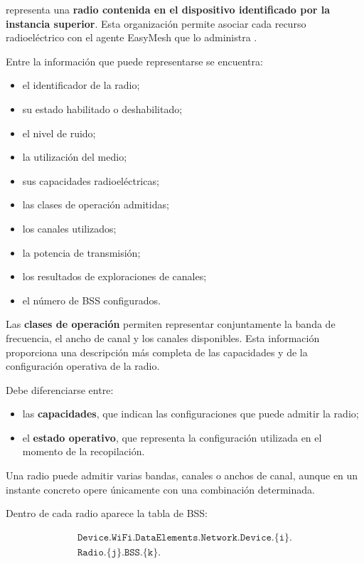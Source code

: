 representa una \textbf{radio contenida en el dispositivo identificado por
la instancia superior}. Esta organización permite asociar cada recurso
radioeléctrico con el agente EasyMesh que lo administra
\cite{bbf_tr181}.

Entre la información que puede representarse se encuentra:

\begin{itemize}
    \item el identificador de la radio;
    \item su estado habilitado o deshabilitado;
    \item el nivel de ruido;
    \item la utilización del medio;
    \item sus capacidades radioeléctricas;
    \item las clases de operación admitidas;
    \item los canales utilizados;
    \item la potencia de transmisión;
    \item los resultados de exploraciones de canales;
    \item el número de BSS configurados.
\end{itemize}

Las \textbf{clases de operación} permiten representar conjuntamente la
banda de frecuencia, el ancho de canal y los canales disponibles. Esta
información proporciona una descripción más completa de las capacidades
y de la configuración operativa de la radio.

Debe diferenciarse entre:

\begin{itemize}
    \item las \textbf{capacidades}, que indican las configuraciones que
    puede admitir la radio;

    \item el \textbf{estado operativo}, que representa la configuración
    utilizada en el momento de la recopilación.
\end{itemize}

Una radio puede admitir varias bandas, canales o anchos de canal, aunque
en un instante concreto opere únicamente con una combinación
determinada.

Dentro de cada radio aparece la tabla de BSS:

\[
\begin{split}
    \texttt{Device.WiFi.DataElements.Network.Device.\{i\}.}\\
    \texttt{Radio.\{j\}.BSS.\{k\}.}
\end{split}
\]


